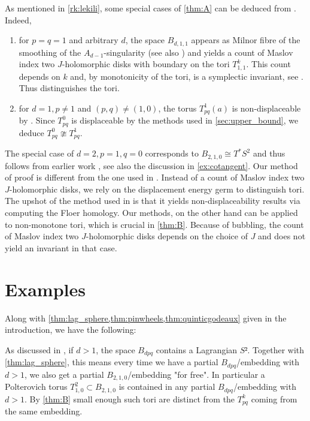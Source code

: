 \documentclass[12pt,a4paper,abstract=true,final]{scrartcl}
\begin{document}
\begin{remark}
    \label{rk:lekili2}
    As mentioned in \cref{rk:lekili}, some special cases of \cref{thm:A} can be deduced from \cite{LekMay14}. Indeed, 
    \begin{enumerate}
        \item for $p = q = 1$ and arbitrary $d$, the space $B_{d,1,1}$ appears as Milnor fibre of the smoothing of the $A_{d-1}$-singularity (see also \cite[Section 7.3]{evans2021atfs}) and \cite[Lemma 2.19]{LekMay14} yields a count of Maslov index two $J$-holomorphic disks with boundary on the tori $T^k_{1,1}$. This count depends on $k$ and, by monotonicity of the tori, is a symplectic invariant, see \cite{EliPol97}. Thus \cite[Lemma 2.19]{LekMay14} distinguishes the tori.
        \item for $d = 1,p \neq 1$ and $(p,q) ≠ (1,0)$, the torus $T^1_{pq}(a)$ is non-displaceable by \cite[Proposition 3.6]{LekMay14}.
        Since $T^0_{pq}$ is displaceable by the methods used in \cref{sec:upper_bound}, we deduce $T^0_{pq} \ncong T^1_{pq}$.
    \end{enumerate}
    The special case of $d=2,p=1,q=0$ corresponds to $B_{2,1,0} \cong T^*S^2$ and thus follows from earlier work \cite{AlbFra08}, see also the discussion in \cref{ex:cotangent}.
    Our method of proof is different from the one used in \cite{LekMay14}.
    Instead of a count of Maslov index two $J$-holomorphic disks, we rely on the displacement energy germ to distinguish tori.
    The upshot of the method used in \cite{LekMay14} is that it yields non-displaceability results via computing the Floer homology.
    Our methods, on the other hand can be applied to non-monotone tori, which is crucial in \cref{thm:B}. Because of bubbling, the count of Maslov index two $J$-holomorphic disks depends on the choice of $J$ and does not yield an invariant in that case.
\end{remark}

\section{Examples}
\label{sec:examples}

Along with \cref{thm:lag_sphere,thm:pinwheels,thm:quinticgodeaux} given in the introduction, we have the following:

As discussed in \cite[Remark 7.10]{evans2021atfs}, if $d>1$, the space $B_{dpq}$ contains a Lagrangian $S²$.
Together with \cref{thm:lag_sphere}, this means every time we have a partial $B_{dpq}$\-/embedding with $d>1$, we also get a partial $B_{2,1,0}$\-/embedding "for free".
In particular a Polterovich torus $T^2_{1,0} ⊂ B_{2,1,0}$ is contained in any partial $B_{dpq}$\-/embedding with $d>1$.
By \cref{thm:B} small enough such tori are distinct from the $T_{pq}^k$ coming from the same embedding.
\end{document}

